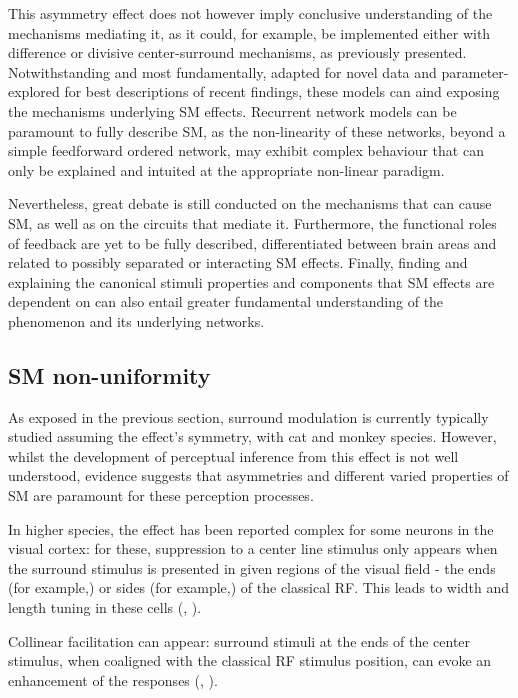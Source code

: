 This asymmetry effect does not however imply conclusive understanding of the mechanisms mediating it, as it could, for example, be implemented either with difference or divisive center-surround mechanisms, as previously presented. Notwithstanding and most fundamentally, adapted for novel data and parameter-explored for best descriptions of recent findings, these models can aind exposing the mechanisms underlying SM effects. Recurrent network models can be paramount to fully describe SM, as the non-linearity of these networks, beyond a simple feedforward ordered network, may exhibit complex behaviour that can only be explained and intuited at the appropriate non-linear paradigm.

Nevertheless, great debate is still conducted on the mechanisms that can cause SM, as well as on the circuits that mediate it. Furthermore, the functional roles of feedback are yet to be fully described, differentiated between brain areas and related to possibly separated or interacting SM effects. Finally, finding and explaining the canonical stimuli properties and components that SM effects are dependent on can also entail greater fundamental understanding of the phenomenon and its underlying networks. 

\subsection{SM non-uniformity}

As exposed in the previous section, surround modulation is currently typically studied assuming the effect's symmetry, with cat and monkey species. However, whilst the development of perceptual inference from this effect is not well understood, evidence suggests that asymmetries and different varied properties of SM are paramount for these perception processes.

In higher species, the effect has been reported complex for some neurons in the visual cortex: for these, suppression to a center line stimulus only appears when the surround stimulus is presented in given regions of the visual field - the ends (for example,\cite{Dreher1972}) or sides (for example,\cite{Born1991}) of the classical RF. This leads to width and length tuning in these cells (\cite{deAngelis1994}, \cite{Sceniak2001}).

Collinear facilitation can appear: surround stimuli at the ends of the center stimulus, when coaligned with the classical RF stimulus position, can evoke an enhancement of the responses (\cite{Kapadia1995}, \cite{Polat1998}).

